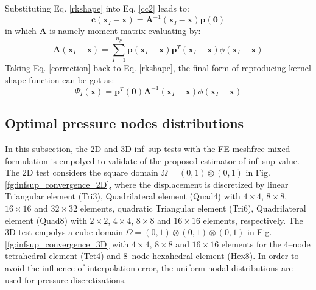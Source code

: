 Substituting Eq. \ref{rkshape} into Eq. \eqref{cc2} leads to:
\begin{equation}\label{correction}
\boldsymbol c(\boldsymbol x_I-\boldsymbol x) = \boldsymbol A^{-1}(\boldsymbol x_I-\boldsymbol x)\boldsymbol p(\boldsymbol 0)
\end{equation}
in which $\boldsymbol A$ is namely moment matrix evaluating by:
\begin{equation}
\boldsymbol A(\boldsymbol x_I-\boldsymbol x) = \sum_{I=1}^{n_p}\boldsymbol p(\boldsymbol x_I-\boldsymbol x) \boldsymbol p^T(\boldsymbol x_I-\boldsymbol x)\phi(\boldsymbol x_I-\boldsymbol x)
\end{equation}
Taking Eq. \eqref{correction} back to Eq. \eqref{rkshape}, the final form of reproducing kernel shape function can be got as:
\begin{equation}
\Psi_I(\boldsymbol x) = \boldsymbol p^T(\boldsymbol 0) \boldsymbol A^{-1}(\boldsymbol x_I-\boldsymbol x)\phi(\boldsymbol x_I-\boldsymbol x)
\end{equation}


\subsection{Optimal pressure nodes distributions}

In this subsection, the 2D and 3D inf--sup tests \cite{chapelle1993} with  the FE-meshfree mixed formulation is empolyed to validate of the proposed estimator of inf--sup value.
The 2D test considers the square domain $\Omega = (0,1)\otimes (0,1)$ in Fig. \ref{fg:infsup_convergence_2D}, where
the displacement is discretized by linear Triangular element (Tri3), Quadrilateral element (Quad4) with
$4\times 4$, $8\times 8$, $16\times 16$ and $32\times 32$ elements,
quadratic Triangular element (Tri6), Quadrilateral element (Quad8) with 
$2\times 2$, $4\times 4$, $8\times 8$ and $16\times 16$ elements, respectively.
The 3D test empolys a cube domain $\Omega = (0,1)\otimes (0,1)\otimes (0,1)$ in Fig. \ref{fg:infsup_convergence_3D} with $4\times 4$, $8\times 8$ and $16\times 16$ elements for the 4--node tetrahedral element (Tet4) and 8--node hexahedral element (Hex8).
In order to avoid the influence of interpolation error,
the uniform nodal distributions are used for pressure discretizations.

